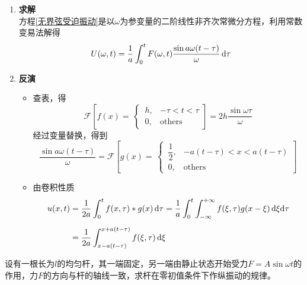 \begin{enumerate}
	\item \textbf{求解}\\
	方程\eqref{无界弦受迫振动}是以$\omega$为参变量的二阶线性非齐次常微分方程，利用常数变易法解得
		\begin{equation}
			U(\omega, t) = \dfrac{1}{a} \int_0^t F(\omega, t) \dfrac{\sin a\omega(t-\tau)}{\omega}\, {\rm{d}} \tau
		\end{equation}
	
	\item \textbf{反演}
	\begin{itemize}
		\item 查表，得
		\[
		\mathcal{F} \left[ f(x) =\, 
		\begin{cases}
			\, h, &- \tau < t < \tau\\
			\, 0, &\text{others}
		\end{cases}
		\right]
		 = 2h \dfrac{\sin \omega \tau}{\omega}
		\]
		经过变量替换，得到
		\[
		\dfrac{\sin a\omega(t - \tau)}{\omega} = \mathcal{F} \left[
		g(x) = \,
		\begin{cases}
			\, \dfrac{1}{2}, & -a(t - \tau) < x < a(t - \tau)\\
			\, 0, & \text{others}
		\end{cases}
		\right]
		\]
		\item 由卷积性质
		\begin{align}
			u(x, t) &= \dfrac{1}{2a} \int_0^t f(x,\tau) *g(x)\,{\rm{d}} \tau = \dfrac{1}{a} \int_0^t \int_{-\infty}^{+\infty} f(\xi, \tau) g(x - \xi) \, {\rm{d}} \xi {\rm{d}} \tau\\[0.5em]
			& = \dfrac{1}{2a} \int_{x-a(t - \tau)}^{x+a(t - \tau)}f(\xi, \tau) \, {\rm{d}} \xi
		\end{align}
	\end{itemize}
\end{enumerate}

\example[有界杆的受迫振动]
设有一根长为$l$的均匀杆，其一端固定，另一端由静止状态开始受力$F = A \sin \omega t$的作用，力$F$的方向与杆的轴线一致，求杆在零初值条件下作纵振动的规律。


